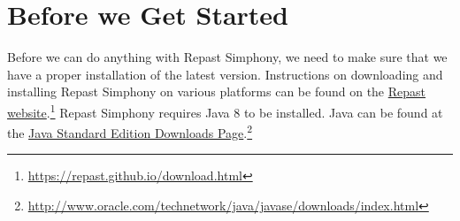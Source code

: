 
\section{Before we Get Started}
Before we can do anything with Repast Simphony, we need to make sure that we have a proper installation of the latest version. Instructions on downloading and installing Repast Simphony on various platforms can be found on the \href{https://repast.github.io/download.html}{Repast website}.\footnote{ \href{https://repast.github.io/download.html}{https://repast.github.io/download.html} } Repast Simphony requires Java 8 to be installed. Java can be found at the \href{http://www.oracle.com/technetwork/java/javase/downloads/index.html}{Java Standard Edition Downloads Page}.\footnote{ \href{http://www.oracle.com/technetwork/java/javase/downloads/index.html}{http://www.oracle.com/technetwork/java/javase/downloads/index.html} }
